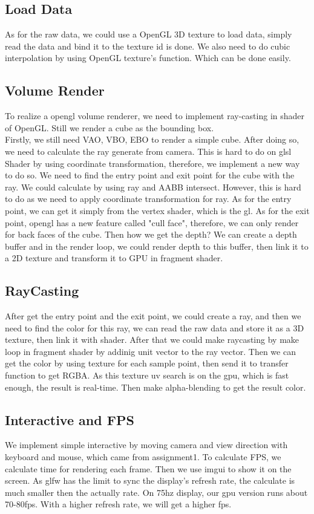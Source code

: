 \documentclass[acmtog]{acmart}
\begin{document}
\subsection{Load Data}
As for the raw data, we could use a OpenGL 3D texture to load data, simply read the data and bind it to the texture id is done. We also need to do cubic interpolation by using OpenGL texture's function. Which can be done easily. 
\subsection{Volume Render}
To realize a opengl volume renderer, we need to implement ray-casting in shader of OpenGL. 
Still we render a cube as the bounding box.\\
Firstly, we still need VAO, VBO, EBO to render a simple cube. After doing so, we need to calculate the ray generate from camera. This is hard to do on glsl Shader by using coordinate transformation, therefore, we implement a new way to do so. 
We need to find the entry point and exit point for the cube with the ray. We could calculate by using ray and AABB intersect. However, this is hard to do as we need to apply coordinate transformation for ray. As for the entry point, we can get it simply from the vertex shader, which is the gl. As for the exit point, opengl has a new feature called "cull face", therefore, we can only render for back faces of the cube. Then how we get the depth? We can create a depth buffer and in the render loop, we could render depth to this buffer, then link it to a 2D texture and transform it to GPU in fragment shader.
\subsection{RayCasting}
After get the entry point and the exit point, we could create a ray, and then we need to find the color for this ray, we can read the raw data and store it as a 3D texture, then link it with shader. After that we could make raycasting by make loop in fragment shader by addinig unit vector to the ray vector. Then we can get the color by using texture for each sample point, then send it to transfer function to get RGBA. As this texture uv search is on the gpu, which is fast enough, the result is real-time. Then make alpha-blending to get the result color. 
\subsection{Interactive and FPS}
We implement simple interactive by moving camera and view direction with keyboard and mouse, which came from assignment1. 
To calculate FPS, we calculate time for rendering each frame. Then we use imgui to show it on the screen. As glfw has the limit to sync the display's refresh rate, the calculate is much smaller then the actually rate. On 75hz display, our gpu version runs about 70-80fps. With a higher refresh rate, we will get a higher fps. 
 
\end{document}
